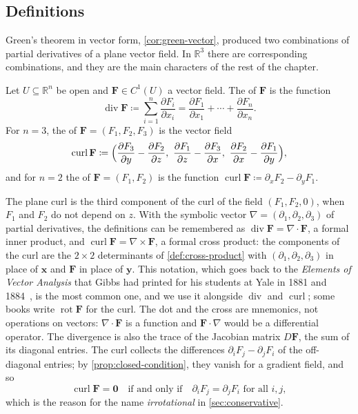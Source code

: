 \subsection{Definitions}

Green's theorem in vector form, \cref{cor:green-vector}, produced two combinations of partial derivatives of a plane vector field. In $\mathbb R^3$ there are corresponding combinations, and they are the main characters of the rest of the chapter.

\begin{definition}
\label{def:div-curl}
Let $U\subseteq\mathbb R^n$ be open and $\mathbf F\in C^1(U)$ a vector field. The  of $\mathbf F$ is the function
\[
\operatorname{div}\mathbf F\coloneqq\sum_{i=1}^n\frac{\partial F_i}{\partial x_i}=\frac{\partial F_1}{\partial x_1}+\cdots+\frac{\partial F_n}{\partial x_n} .
\]
For $n=3$, the  of $\mathbf F=(F_1,F_2,F_3)$ is the vector field
\[
\operatorname{curl}\mathbf F\coloneqq\Bigl(\frac{\partial F_3}{\partial y}-\frac{\partial F_2}{\partial z},\ \frac{\partial F_1}{\partial z}-\frac{\partial F_3}{\partial x},\ \frac{\partial F_2}{\partial x}-\frac{\partial F_1}{\partial y}\Bigr),
\]
and for $n=2$ the  of $\mathbf F=(F_1,F_2)$ is the function $\operatorname{curl}\mathbf F\coloneqq\partial_xF_2-\partial_yF_1$.
\end{definition}

The plane curl is the third component of the curl of the field $(F_1,F_2,0)$, when $F_1$ and $F_2$ do not depend on $z$. With the symbolic vector $\nabla=(\partial_1,\partial_2,\partial_3)$ of partial derivatives, the definitions can be remembered as $\operatorname{div}\mathbf F=\nabla\cdot\mathbf F$, a formal inner product, and $\operatorname{curl}\mathbf F=\nabla\times\mathbf F$, a formal cross product: the components of the curl are the $2\times2$ determinants of \cref{def:cross-product} with $(\partial_1,\partial_2,\partial_3)$ in place of $\mathbf x$ and $\mathbf F$ in place of $\mathbf y$. This notation, which goes back to the \emph{Elements of Vector Analysis} that Gibbs had printed for his students at Yale in 1881 and 1884~\cite{crowe1967}, is the most common one, and we use it alongside $\operatorname{div}$ and $\operatorname{curl}$; some books write $\operatorname{rot}\mathbf F$ for the curl. The dot and the cross are mnemonics, not operations on vectors: $\nabla\cdot\mathbf F$ is a function and $\mathbf F\cdot\nabla$ would be a differential operator. The divergence is also the trace of the Jacobian matrix $D\mathbf F$, the sum of its diagonal entries. The curl collects the differences $\partial_iF_j-\partial_jF_i$ of the off-diagonal entries; by \cref{prop:closed-condition}, they vanish for a gradient field, and so
\[
\operatorname{curl}\mathbf F=\mathbf0\quad\text{if and only if}\quad\partial_iF_j=\partial_jF_i\text{ for all }i,j ,
\]
which is the reason for the name \emph{irrotational} in \cref{sec:conservative}.

